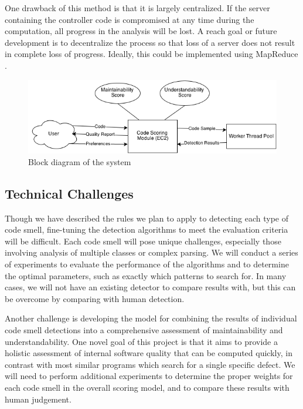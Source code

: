 \documentclass{sig-alternate}
\begin{document}
One drawback of this method is that it is largely centralized. If the server containing the controller code is compromised at any time during the computation, all progress in the analysis will be lost. A reach goal or future development is to decentralize the process so that loss of a server does not result in complete loss of progress. Ideally, this could be implemented using MapReduce \cite{dean2008mapreduce}.


\begin{figure}[htb!]
	\begin{center}
		\includegraphics[width=0.9\linewidth]{block_diagram}
	\end{center}
	\vspace{-12pt}
	\caption{Block diagram of the system}
	\label{fig:some_graph}
\end{figure}

\subsection{Technical Challenges}
\label{subsec:tech_challenges}

Though we have described the rules we plan to apply to detecting each type of code smell, fine-tuning the detection algorithms to meet the evaluation criteria will be difficult. Each code smell will pose unique challenges, especially those involving analysis of multiple classes or complex parsing. We will conduct a series of experiments to evaluate the performance of the algorithms and to determine the optimal parameters, such as exactly which patterns to search for. In many cases, we will not have an existing detector to compare results with, but this can be overcome by comparing with human detection. 

Another challenge is developing the model for combining the results of individual code smell detections into a comprehensive assessment of maintainability and understandability. One novel goal of this project is that it aims to provide a holistic assessment of internal software quality that can be computed quickly, in contrast with most similar programs which search for a single specific defect. We will need to perform additional experiments to determine the proper weights for each code smell in the overall scoring model, and to compare these results with human judgement.
\end{document}
